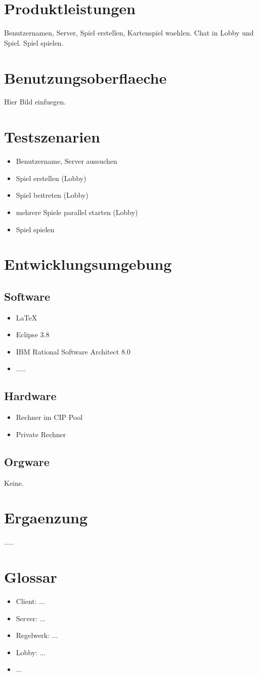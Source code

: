 \documentclass{article}
\begin{document}
\section{Produktleistungen}
Benutzernamen, Server, Spiel erstellen, Kartenspiel waehlen. Chat in Lobby und Spiel. Spiel spielen.

\section{Benutzungsoberflaeche}
Hier Bild einfuegen.

\section{Testszenarien}
\begin{itemize}
	\item Benutzername, Server aussuchen
	\item Spiel erstellen (Lobby)
	\item Spiel beitreten (Lobby)
	\item mehrere Spiele parallel starten (Lobby)
	\item Spiel spielen 
\end{itemize}

\section{Entwicklungsumgebung}
\subsection{Software}
\begin{itemize}
	\item LaTeX
	\item Eclipse 3.8
	\item IBM Rational Software Architect 8.0
	\item .....
\end{itemize}

\subsection{Hardware}
\begin{itemize}
	\item Rechner im CIP Pool	
	\item Private Rechner
\end{itemize}

\subsection{Orgware}
Keine.

\section{Ergaenzung}
.....
\section{Glossar}
\begin{itemize}
	\item Client: ...
	\item Server: ...
	\item Regelwerk: ...
	\item Lobby: ...
	\item ...
\end{itemize}
\end{document}
